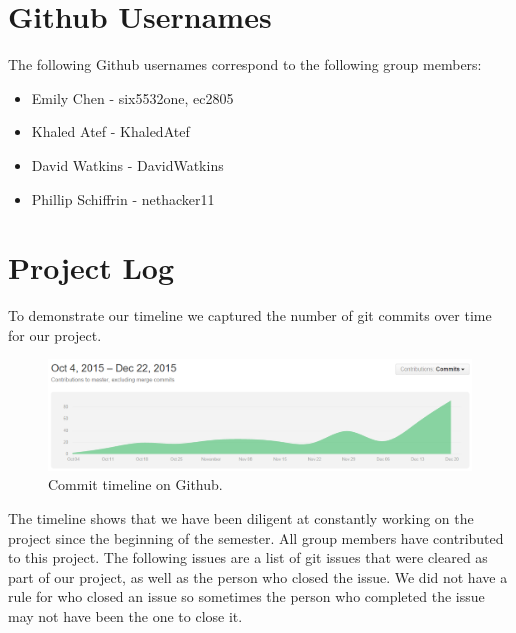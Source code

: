 \begin{homeworkProblem}
	\section{Github Usernames}
	The following Github usernames correspond to the following group members:
	\begin{itemize}
		\item Emily Chen - six5532one, ec2805
		\item Khaled Atef - KhaledAtef
		\item David Watkins - DavidWatkins
		\item Phillip Schiffrin - nethacker11
	\end{itemize}
 
	\section{Project Log}
	To demonstrate our timeline we captured the number of git commits over time for our project. 
	
	\begin{figure}[!ht]
		\centering
		\includegraphics[width=5.5in]{Includes/timeline}
		\caption{Commit timeline on Github.}
	\end{figure}
	\pagebreak
	The timeline shows that we have been diligent at constantly working on the project since the beginning of the semester. All group members have contributed to this project. The following issues are a list of git issues that were cleared as part of our project, as well as the person who closed the issue. We did not have a rule for who closed an issue so sometimes the person who completed the issue may not have been the one to close it. 
	

\end{homeworkProblem}

